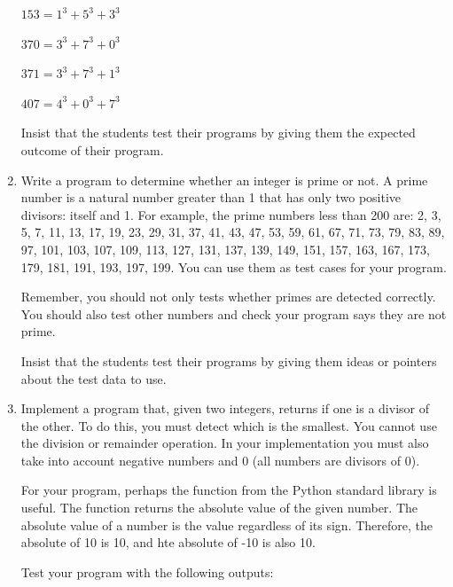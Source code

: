 \documentclass[
  fontsize=10pt,
  a4paper,
]{scrartcl}
\newenvironment{howTILEd}%
  {\begin{mdframed}[skipabove=10pt,skipbelow=10pt,backgroundcolor=pink!40]}%
  {\end{mdframed}}
\begin{document}
\begin{enumerate}
$153=1^3+5^3+3^3$

$370=3^3+7^3+0^3$

$371=3^3+7^3+1^3$

$407=4^3+0^3+7^3$

\begin{howTILEd}
Insist that the students test their programs by giving them the expected outcome of their program.
\end{howTILEd}


\item Write a program to determine whether an integer is prime or not. A prime number is a natural number greater than 1 that has only two positive divisors: itself and 1. For example, the prime numbers less than 200 are:
2, 3, 5, 7, 11, 13, 17, 19, 23, 29, 31, 37, 41, 43, 47, 53, 59, 61, 67, 71, 73, 79, 83, 89, 97, 101, 103, 107, 109, 113, 127, 131, 137, 139, 149, 151, 157, 163, 167, 173, 179, 181, 191, 193, 197, 199. You can use them as test cases for your program. 

Remember, you should not only tests whether primes are detected correctly. You should also test other numbers and check your program says they are not prime.


\begin{howTILEd}
Insist that the students test their programs by giving them ideas or pointers about the test data to use.
\end{howTILEd}






\item Implement a program that, given two integers, returns if one is a divisor of the other. To do this, you must detect which is the smallest. You cannot use the division or remainder operation. In your implementation you must also take into account negative numbers and 0 (all numbers are divisors of 0).

For your program, perhaps the  function from the Python standard library is useful. The  function returns the absolute value of the given number. The absolute value of a number is the value regardless of its sign. Therefore, the absolute of 10 is 10, and hte absolute of -10 is also 10.

Test your program with the following outputs:


\end{enumerate}
\end{document}
